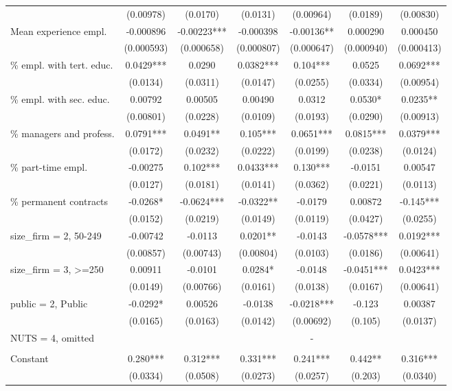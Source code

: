 \documentclass[]{article}
\begin{document}
\begin{tabular}{lcccccc}
 & (0.00978) & (0.0170) & (0.0131) & (0.00964) & (0.0189) & (0.00830) \\
Mean experience empl. & -0.000896 & -0.00223*** & -0.000398 & -0.00136** & 0.000290 & 0.000450 \\
 & (0.000593) & (0.000658) & (0.000807) & (0.000647) & (0.000940) & (0.000413) \\
\% empl. with tert. educ. & 0.0429*** & 0.0290 & 0.0382*** & 0.104*** & 0.0525 & 0.0692*** \\
 & (0.0134) & (0.0311) & (0.0147) & (0.0255) & (0.0334) & (0.00954) \\
\% empl. with sec. educ. & 0.00792 & 0.00505 & 0.00490 & 0.0312 & 0.0530* & 0.0235** \\
 & (0.00801) & (0.0228) & (0.0109) & (0.0193) & (0.0290) & (0.00913) \\
\% managers and profess. & 0.0791*** & 0.0491** & 0.105*** & 0.0651*** & 0.0815*** & 0.0379*** \\
 & (0.0172) & (0.0232) & (0.0222) & (0.0199) & (0.0238) & (0.0124) \\
\% part-time empl. & -0.00275 & 0.102*** & 0.0433*** & 0.130*** & -0.0151 & 0.00547 \\
 & (0.0127) & (0.0181) & (0.0141) & (0.0362) & (0.0221) & (0.0113) \\
\% permanent contracts & -0.0268* & -0.0624*** & -0.0322** & -0.0179 & 0.00872 & -0.145*** \\
 & (0.0152) & (0.0219) & (0.0149) & (0.0119) & (0.0427) & (0.0255) \\
size\_firm = 2, 50-249 & -0.00742 & -0.0113 & 0.0201** & -0.0143 & -0.0578*** & 0.0192*** \\
 & (0.00857) & (0.00743) & (0.00804) & (0.0103) & (0.0186) & (0.00641) \\
size\_firm = 3, >=250 & 0.00911 & -0.0101 & 0.0284* & -0.0148 & -0.0451*** & 0.0423*** \\
 & (0.0149) & (0.00766) & (0.0161) & (0.0138) & (0.0167) & (0.00641) \\
public = 2, Public & -0.0292* & 0.00526 & -0.0138 & -0.0218*** & -0.123 & 0.00387 \\
 & (0.0165) & (0.0163) & (0.0142) & (0.00692) & (0.105) & (0.0137) \\
NUTS = 4, omitted &  &  &  & - &  &  \\
 &  &  &  &  &  &  \\
Constant & 0.280*** & 0.312*** & 0.331*** & 0.241*** & 0.442** & 0.316*** \\
 & (0.0334) & (0.0508) & (0.0273) & (0.0257) & (0.203) & (0.0340) \\

\end{tabular}
\end{document}
